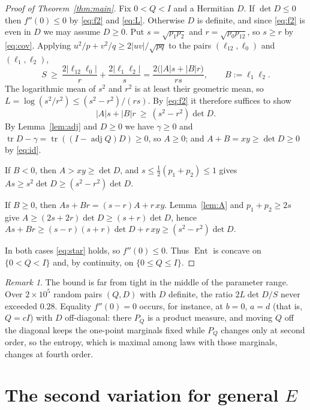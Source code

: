 \documentclass[11pt]{amsart}
\theoremstyle{remark}
\newtheorem{remark}[theorem]{Remark}
\numberwithin{equation}{section}
\newcommand{\Ent}{\operatorname{Ent}}
\newcommand{\tr}{\operatorname{tr}}
\newcommand{\adj}{\operatorname{adj}}
\begin{document}
\begin{proof}[Proof of Theorem~\ref{thm:main}]
Fix $0<Q<I$ and a Hermitian $D$. If $\det D\le0$ then $f''(0)\le0$ by \eqref{eq:f2} and \eqref{eq:L}. Otherwise $D$ is definite, and since \eqref{eq:f2} is even in $D$ we may assume $D\ge0$. Put $s=\sqrt{p_1p_2}$ and $r=\sqrt{p_0p_{12}}$, so $s\ge r$ by \eqref{eq:cov}. Applying $u^2/p+v^2/q\ge2|uv|/\sqrt{pq}$ to the pairs $(\ell_{12},\ell_0)$ and $(\ell_1,\ell_2)$,
\[
S\ \ge\ \frac{2|\ell_{12}\ell_0|}{r}+\frac{2|\ell_1\ell_2|}{s}=\frac{2\bigl(|A|s+|B|r\bigr)}{rs},\qquad B:=\ell_1\ell_2 .
\]
The logarithmic mean of $s^2$ and $r^2$ is at least their geometric mean, so $L=\log(s^2/r^2)\le(s^2-r^2)/(rs)$. By \eqref{eq:f2} it therefore suffices to show
\begin{equation}\label{eq:star}
|A|s+|B|r\ \ge\ (s^2-r^2)\det D .
\end{equation}
By Lemma~\ref{lem:adj} and $D\ge0$ we have $\gamma\ge0$ and $\tr D-\gamma=\tr((I-\adj Q)D)\ge0$, so $A\ge0$; and $A+B=xy\ge\det D\ge0$ by \eqref{eq:id}.

If $B<0$, then $A>xy\ge\det D$, and $s\le\frac12(p_1+p_2)\le1$ gives $As\ge s^2\det D\ge(s^2-r^2)\det D$.

If $B\ge0$, then $As+Br=(s-r)A+r\,xy$. Lemma~\ref{lem:A} and $p_1+p_2\ge2s$ give $A\ge(2s+2r)\det D\ge(s+r)\det D$, hence $As+Br\ge(s-r)(s+r)\det D+r\,xy\ge(s^2-r^2)\det D$.

In both cases \eqref{eq:star} holds, so $f''(0)\le0$. Thus $\Ent$ is concave on $\{0<Q<I\}$ and, by continuity, on $\{0\le Q\le I\}$.
\end{proof}

\begin{remark}\label{rem:sharp}
The bound is far from tight in the middle of the parameter range. Over $2\times10^5$ random pairs $(Q,D)$ with $D$ definite, the ratio $2L\det D/S$ never exceeded $0.28$. Equality $f''(0)=0$ occurs, for instance, at $b=0$, $a=d$ (that is, $Q=cI$) with $D$ off-diagonal: there $P_Q$ is a product measure, and moving $Q$ off the diagonal keeps the one-point marginals fixed while $P_Q$ changes only at second order, so the entropy, which is maximal among laws with those marginals, changes at fourth order.
\end{remark}

\section{The second variation for general $E$}\label{sec:general}
\end{document}
